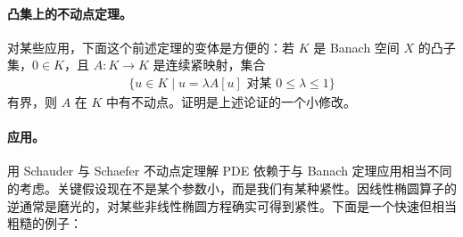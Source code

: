\documentclass[../../main.tex]{subfiles}
\begin{document}
\paragraph{凸集上的不动点定理。}对某些应用，下面这个前述定理的变体是方便的：若 $K$ 是 Banach 空间 $X$ 的凸子集，$0\in K$，且 $A:K\to K$ 是连续紧映射，集合
\begin{align*}
\{u\in K\mid u=\lambda A[u]\text{ 对某 }0\leqslant\lambda\leqslant 1\}
\end{align*}
有界，则 $A$ 在 $K$ 中有不动点。证明是上述论证的一个小修改。

\paragraph{应用。}用 Schauder 与 Schaefer 不动点定理解 PDE 依赖于与 Banach 定理应用相当不同的考虑。关键假设现在不是某个参数小，而是我们有某种紧性。因线性椭圆算子的逆通常是磨光的，对某些非线性椭圆方程确实可得到紧性。下面是一个快速但相当粗糙的例子：
\end{document}
